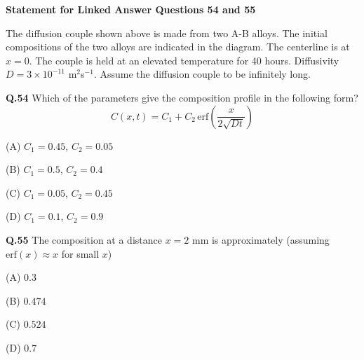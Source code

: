 \documentclass[journal,12pt,onecolumn]{IEEEtran}
\theoremstyle{remark}
\begin{document}
\begin{enumerate}
    \bigskip

    \textbf{Statement for Linked Answer Questions 54 and 55}
    \begin{center}
    \end{center}

    The diffusion couple shown above is made from two A-B alloys. The initial compositions of the two alloys are indicated in the diagram. The centerline is at $x=0$. The couple is held at an elevated temperature for 40 hours. Diffusivity $D=3\times 10^{-11}$ m$^2$s$^{-1}$. Assume the diffusion couple to be infinitely long.

    \vspace{1em}
    \noindent\textbf{Q.54} Which of the parameters give the composition profile in the following form?
    \[
    C(x,t) = C_1 + C_2\,\mathrm{erf} \left( \frac{x}{2\sqrt{Dt}} \right)
    \]
    \hfill{}
    \begin{enumerate}[label=(\Alph*)]
    \begin{multicols}{4}
    \item[(A)] $C_1 = 0.45$, $C_2 = 0.05$
    \item[(B)] $C_1 = 0.5$, $C_2 = 0.4$
    \item[(C)] $C_1 = 0.05$, $C_2 = 0.45$
    \item[(D)] $C_1 = 0.1$, $C_2 = 0.9$
    \end{multicols}
    \end{enumerate}

    \vspace{1em}
    \noindent\textbf{Q.55} The composition at a distance $x = 2$ mm is approximately (assuming $\mathrm{erf}(x) \approx x$ for small $x$)
    \hfill{}
    \begin{enumerate}[label=(\Alph*)]
    \begin{multicols}{4}
    \item[(A)] $0.3$
    \item[(B)] $0.474$
    \item[(C)] $0.524$
    \item[(D)] $0.7$
    \end{multicols}
    \end{enumerate}
   


\end{enumerate}
\end{document}
